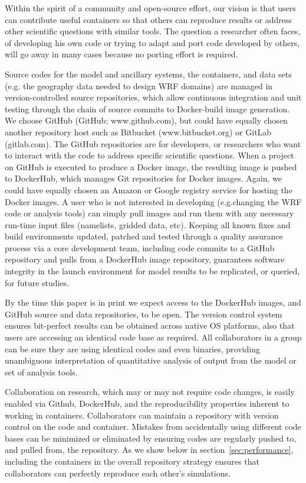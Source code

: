 \documentclass[final]{ametsoc}
\begin{document}
Within the spirit of a community and open-source effort, our vision is that users can contribute useful containers so that others can reproduce results or address other scientific questions with similar tools. The question a researcher often faces, of developing his own code or trying to adapt and port code developed by others, will go away in many cases because no porting effort is required. 

Source codes for the model and ancillary systems, the containers, and data sets (e.g. the geography data needed to design WRF domains) are managed in version-controlled source repositories, which allow continuous integration and unit testing through the chain of source commits to Docker-build image generation.  We choose GitHub (GitHub; www.github.com), but could have equally chosen another repository host such as Bitbucket (www.bitbucket.org) or GitLab (gitlab.com). The GitHub repositories are for developers, or researchers who want to interact with the code to address specific scientific questions. When a project on GitHub is executed to produce a Docker image, the resulting image is pushed to DockerHub, which manages Git repositories for Docker images. Again, we could have equally chosen an Amazon or Google registry service for hosting the Docker images. A user who is not interested in developing (e.g.\@ changing the WRF code or analysis tools) can simply pull images and run them with any necessary run-time input files (namelists, gridded data, etc). Keeping all known fixes and build environments updated, patched and tested through a quality assurance process via a core development team, including code commits to a GitHub repository and pulls from a DockerHub image repository, guarantees software integrity in the launch environment for model results to be replicated, or queried, for future studies.

By the time this paper is in print we expect access to the DockerHub images, and GitHub source and data repositories, to be open.  The version control system ensures bit-perfect results can be obtained across native OS platforms, also that users are accessing an identical code base as required. All collaborators in a group can be sure they are using identical codes and even binaries, providing unambiguous interpretation of quantitative analysis of output from the model or set of analysis tools.

Collaboration on research, which may or may not require code changes, is easily enabled via Github, DockerHub, and the reproducibility properties inherent to working in containers. Collaborators can maintain a repository with version control on the code and container. Mistakes from accidentally using different code bases can be minimized or eliminated by ensuring codes are regularly pushed to, and pulled from, the repository. As we show below in section~\ref{sec:performance}, including the containers in the overall repository strategy ensures that collaborators can perfectly reproduce each other's simulations.
\end{document}
